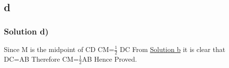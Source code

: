 \documentclass{beamer}
\begin{document}
\subsection{d}
\begin{frame}
\frametitle{Solution d)}
\label{d}
Since M is the midpoint of CD
\newline
CM=$\frac{1}{2}$ DC
From \hyperlink{b}{Solution b} it is clear that DC=AB
\newline
Therefore CM=$\frac{1}{2}$AB
\newline
Hence Proved.

\end{frame}
\end{document}
